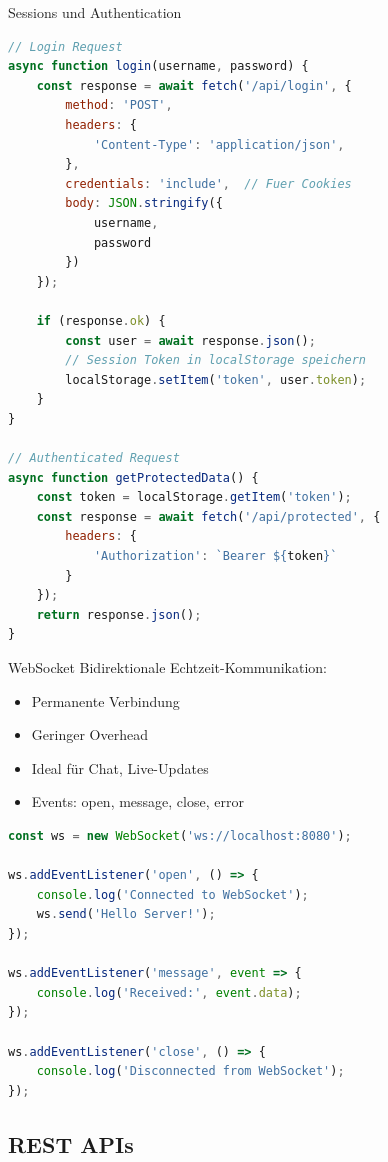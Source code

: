 \begin{KR}{Sessions und Authentication}
\begin{lstlisting}[language=JavaScript, style=basesmol]
// Login Request
async function login(username, password) {
    const response = await fetch('/api/login', {
        method: 'POST',
        headers: {
            'Content-Type': 'application/json',
        },
        credentials: 'include',  // Fuer Cookies
        body: JSON.stringify({
            username,
            password
        })
    });
    
    if (response.ok) {
        const user = await response.json();
        // Session Token in localStorage speichern
        localStorage.setItem('token', user.token);
    }
}

// Authenticated Request
async function getProtectedData() {
    const token = localStorage.getItem('token');
    const response = await fetch('/api/protected', {
        headers: {
            'Authorization': `Bearer ${token}`
        }
    });
    return response.json();
}
\end{lstlisting}
\end{KR}

\begin{concept}{WebSocket}
    Bidirektionale Echtzeit-Kommunikation:
    \begin{itemize}
        \item Permanente Verbindung
        \item Geringer Overhead
        \item Ideal für Chat, Live-Updates
        \item Events: open, message, close, error
    \end{itemize}

\begin{lstlisting}[language=JavaScript, style=basesmol]
const ws = new WebSocket('ws://localhost:8080');

ws.addEventListener('open', () => {
    console.log('Connected to WebSocket');
    ws.send('Hello Server!');
});

ws.addEventListener('message', event => {
    console.log('Received:', event.data);
});

ws.addEventListener('close', () => {
    console.log('Disconnected from WebSocket');
});
\end{lstlisting}
\end{concept}

\subsection{REST APIs}

